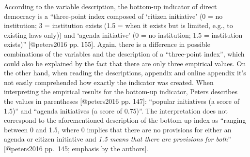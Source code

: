 \documentclass[]{article}
\begin{document}
According to the variable description, the bottom-up indicator of direct
democracy is a ``three-point index composed of `citizen initiative' (0 =
no institution; 3 = institution exists (1.5 = when it exists but is
limited, e.g., to existing laws only)) and `agenda initiative' (0 = no
institution; 1.5 = institution exists)'' {[}@peters2016 pp. 155{]}.
Again, there is a difference in possible combinations of the variables
and the description of a ``three-point index'', which could also be
explained by the fact that there are only three empirical values. On the
other hand, when reading the descriptions, appendix and online appendix
it's not easily comprehended how exactly the indicator was created. When
interpreting the empirical results for the bottom-up indicator, Peters
describes the values in parentheses {[}@peters2016 pp. 147{]}: ``popular
initiatives (a score of 1.5)'' and ``agenda initiatives (a score of
0.75)''. The interpretation does not correspond to the aforementioned
description of the bottom-up index as ``ranging between 0 and 1.5, where
0 implies that there are no provisions for either an agenda or citizen
initiative and \emph{1.5 means that there are provisions for both}''
{[}@peters2016 pp.~145; emphasis by the authors{]}.
\end{document}
